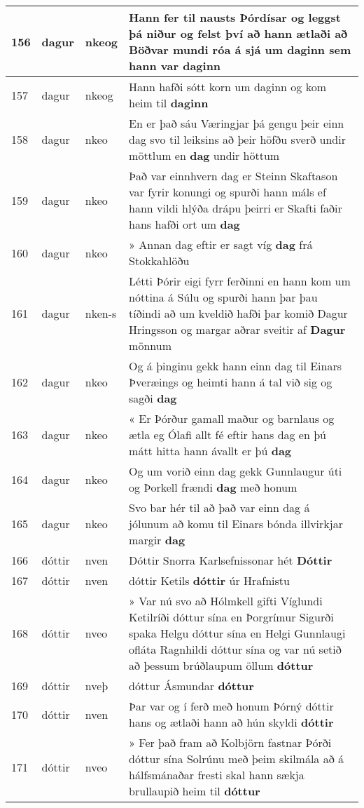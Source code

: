 \documentclass{article}
\begin{document}
\begin{longtable}{p{1cm}|p{1cm}|p{1cm}|p{13cm}}
\hline
156&dagur&nkeog&Hann fer til nausts Þórdísar og leggst þá niður og felst því að hann ætlaði að Böðvar mundi róa á sjá um daginn sem hann var \textbf{daginn} \\
\hline
157&dagur&nkeog&Hann hafði sótt korn um daginn og kom heim til \textbf{daginn} \\
\hline
158&dagur&nkeo&En er það sáu Væringjar þá gengu þeir einn dag svo til leiksins að þeir höfðu sverð undir möttlum en \textbf{dag} undir höttum\\
\hline
159&dagur&nkeo&Það var einnhvern dag er Steinn Skaftason var fyrir konungi og spurði hann máls ef hann vildi hlýða drápu þeirri er Skafti faðir hans hafði ort um \textbf{dag} \\
\hline
160&dagur&nkeo&» Annan dag eftir er sagt víg \textbf{dag} frá Stokkahlöðu\\
\hline
161&dagur&nken-s&Létti Þórir eigi fyrr ferðinni en hann kom um nóttina á Súlu og spurði hann þar þau tíðindi að um kveldið hafði þar komið Dagur Hringsson og margar aðrar sveitir af \textbf{Dagur} mönnum\\
\hline
162&dagur&nkeo&Og á þinginu gekk hann einn dag til Einars Þveræings og heimti hann á tal við sig og sagði \textbf{dag} \\
\hline
163&dagur&nkeo&« Er Þórður gamall maður og barnlaus og ætla eg Ólafi allt fé eftir hans dag en þú mátt hitta hann ávallt er þú \textbf{dag} \\
\hline
164&dagur&nkeo&Og um vorið einn dag gekk Gunnlaugur úti og Þorkell frændi \textbf{dag} með honum\\
\hline
165&dagur&nkeo&Svo bar hér til að það var einn dag á jólunum að komu til Einars bónda illvirkjar margir \textbf{dag} \\
\hline
166&dóttir&nven&Dóttir Snorra Karlsefnissonar hét \textbf{Dóttir} \\
\hline
167&dóttir&nven&dóttir Ketils \textbf{dóttir} úr Hrafnistu\\
\hline
168&dóttir&nveo&» Var nú svo að Hólmkell gifti Víglundi Ketilríði dóttur sína en Þorgrímur Sigurði spaka Helgu dóttur sína en Helgi Gunnlaugi ofláta Ragnhildi dóttur sína og var nú setið að þessum brúðlaupum öllum \textbf{dóttur} \\
\hline
169&dóttir&nveþ&dóttur Ásmundar \textbf{dóttur} \\
\hline
170&dóttir&nven&Þar var og í ferð með honum Þórný dóttir hans og ætlaði hann að hún skyldi \textbf{dóttir} \\
\hline
171&dóttir&nveo&» Fer það fram að Kolbjörn fastnar Þórði dóttur sína Solrúnu með þeim skilmála að á hálfsmánaðar fresti skal hann sækja brullaupið heim til \textbf{dóttur} \\

\end{longtable}
\end{document}
